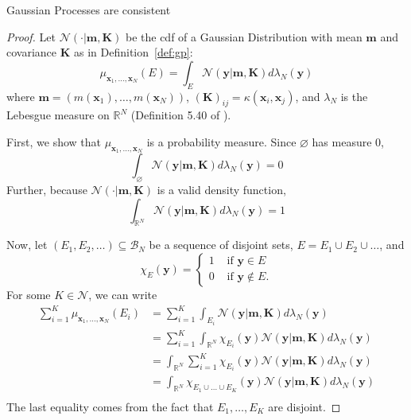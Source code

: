 \begin{theorem}
    \label{thm:gp-const}
    Gaussian Processes are consistent
\end{theorem}
\begin{proof}
    Let $\mathcal{N}( \cdot | \mathbf{m}, \mathbf{K})$
    be the cdf of a Gaussian Distribution with mean $\mathbf{m}$ and covariance $\mathbf{K}$ as in Definition~\ref{def:gp}:
    \begin{equation*}
        \mu_{\mathbf{x}_1, \ldots, \mathbf{x}_N}(E)
        = \int_{E} \mathcal{N}( \mathbf{y} | \mathbf{m}, \mathbf{K}) d \lambda_N(\mathbf{y})
    \end{equation*}
    where $\mathbf{m} = (m(\mathbf{x}_1), \ldots, m(\mathbf{x}_N))$,
    $(\mathbf{K})_{ij} = \kappa(\mathbf{x}_i, \mathbf{x}_j)$, and
    $\lambda_N$ is the Lebesgue measure on $\mathbb{R}^{N}$ (Definition 5.40 of \cite{axler2020}).

    First, we show that $\mu_{\mathbf{x}_1, \ldots, \mathbf{x}_N}$ is a probability measure.
    Since $\varnothing$ has measure 0,
    \begin{equation*}
        \int_{\varnothing} \mathcal{N}(\mathbf{y} | \mathbf{m}, \mathbf{K}) d \lambda_N(\mathbf{y}) = 0
    \end{equation*}
    Further, because $\mathcal{N}( \cdot | \mathbf{m}, \mathbf{K})$ is a valid density function,
    \begin{equation*}
        \int_{\mathbb{R}^{N}} \mathcal{N}(\mathbf{y} | \mathbf{m}, \mathbf{K}) d \lambda_N(\mathbf{y}) = 1
    \end{equation*}

    Now, let $(E_1, E_2, \ldots) \subseteq \mathcal{B}_{N}$ be a sequence of disjoint sets, $E = E_1 \cup E_2 \cup \ldots$, and
    \begin{equation*}
        \chi_{E}(\mathbf{y}) =
        \begin{cases}
            1 & \text{ if $\mathbf{y} \in E$} \\
            0 & \text{ if $\mathbf{y} \notin E$}.
        \end{cases}
    \end{equation*}
    For some $K \in \mathcal{N}$, we can write
    \begin{align*}
        \sum_{i = 1}^{K} \mu_{\mathbf{x}_1, \ldots, \mathbf{x}_N}(E_i)
        & = \sum_{i = 1}^{K} \int_{E_i} \mathcal{N}(\mathbf{y} | \mathbf{m}, \mathbf{K}) d \lambda_N(\mathbf{y}) \\
        & = \sum_{i = 1}^{K} \int_{\mathbb{R}^{N}} \chi_{E_i}(\mathbf{y})\mathcal{N}(\mathbf{y} | \mathbf{m}, \mathbf{K}) d \lambda_N(\mathbf{y}) \\
        & =  \int_{\mathbb{R}^{N}} \sum_{i = 1}^{K}\chi_{E_i}(\mathbf{y})\mathcal{N}(\mathbf{y} | \mathbf{m}, \mathbf{K}) d \lambda_N(\mathbf{y}) \\
        & =  \int_{\mathbb{R}^{N}} \chi_{E_1 \cup \ldots \cup E_K}(\mathbf{y})\mathcal{N}(\mathbf{y} | \mathbf{m}, \mathbf{K}) d \lambda_N(\mathbf{y}) \\
    \end{align*}
    The last equality comes from the fact that $E_1, \ldots, E_K$ are disjoint.


\end{proof}
